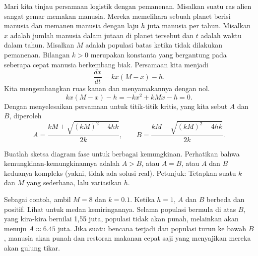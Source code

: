 Mari kita tinjau persamaan logistik
dengan pemanenan.
Misalkan suatu ras alien sangat gemar
memakan manusia.  Mereka memelihara sebuah planet berisi manusia dan memanen
manusia dengan laju $h$ juta manusia per
tahun.  Misalkan $x$
adalah jumlah manusia dalam jutaan di planet tersebut dan $t$ adalah waktu dalam tahun.
Misalkan $M$ adalah populasi
batas ketika tidak dilakukan pemanenan.  Bilangan $k > 0$ merupakan
konstanta yang bergantung
pada seberapa cepat manusia berkembang biak.  Persamaan kita menjadi
\begin{equation*}
\frac{dx}{dt} = kx(M-x) - h .
\end{equation*}
Kita mengembangkan ruas kanan dan menyamakannya dengan nol.
\begin{equation*}
kx(M-x) - h = -kx^2+kMx - h  = 0.
\end{equation*}
Dengan menyelesaikan persamaan untuk
titik-titik kritis,
yang kita sebut $A$ dan $B$, diperoleh
\begin{equation*}
A = \frac{kM + \sqrt{{(kM)}^2 - 4hk}}{2k}, \qquad
B = \frac{kM - \sqrt{{(kM)}^2 - 4hk}}{2k} .
\end{equation*}

\begin{exercise}
Buatlah sketsa diagram fase untuk berbagai kemungkinan.  Perhatikan
bahwa kemungkinan-kemungkinannya adalah $A > B$, atau $A=B$, atau $A$ dan $B$ keduanya kompleks
(yakni, tidak ada solusi real).  Petunjuk: Tetapkan suatu $k$ dan $M$ yang sederhana, lalu variasikan
$h$.
\end{exercise}

Sebagai contoh, ambil $M=8$ dan $k=0.1$.
Ketika $h=1$, $A$ dan $B$ berbeda dan positif.
Lihat  untuk medan kemiringannya.  Selama
populasi bermula di atas $B$, yang kira-kira bernilai 1,55 juta,
populasi tidak akan punah, melainkan akan menuju $A \approx
6.45$ juta.  Jika suatu bencana terjadi dan
populasi turun ke bawah $B$,
manusia akan punah dan restoran makanan cepat saji yang menyajikan mereka akan
gulung tikar.

